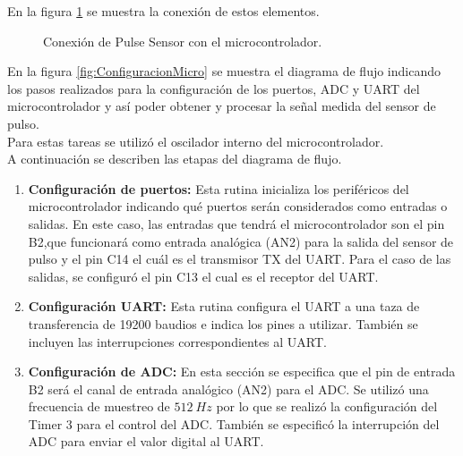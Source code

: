 En la figura \ref{fig:conexionPS} se muestra la conexión de estos elementos. \\

\begin{figure}[htbp!]
	\centering
	\caption{Conexión de Pulse Sensor con el microcontrolador.}
	\label{fig:conexionPS}
\end{figure}

En la figura \ref{fig:ConfiguracionMicro} se muestra el diagrama de flujo indicando los pasos realizados para la configuración de los puertos, ADC y UART del microcontrolador y así poder obtener y procesar la señal medida del sensor de pulso. \\

Para estas tareas se utilizó el oscilador interno del microcontrolador. \\

A continuación se describen las etapas del diagrama de flujo.

\begin{enumerate}
	\item \textbf{Configuración de puertos:} Esta rutina inicializa los periféricos del microcontrolador indicando qué puertos serán considerados como entradas o salidas. En este caso, las entradas que tendrá el microcontrolador son el pin B2,que funcionará como entrada analógica (AN2) para la salida del sensor de pulso y el pin C14 el cuál es el transmisor TX del UART. Para el caso de las salidas, se configuró el pin C13 el cual es el receptor del UART. 
	
	
	\item \textbf{Configuración UART:} Esta rutina configura el UART a una taza de transferencia de 19200 baudios e indica los pines a utilizar. También se incluyen las interrupciones correspondientes al UART.
	
	\item \textbf{Configuración de ADC:} En esta sección se especifica que el pin de entrada B2 será el canal de entrada analógico (AN2) para el ADC. Se utilizó una frecuencia de muestreo de $512\ Hz$ por lo que se realizó la configuración del Timer 3 para el control del ADC. También se especificó la interrupción del ADC para enviar el valor digital al UART. 
	
\end{enumerate}

